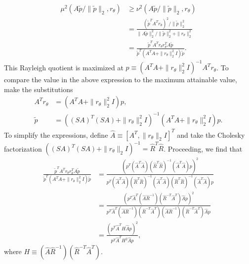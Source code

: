 \documentclass{article}
\newcommand{\ts}{^T}
\begin{document}
\begin{align*}
    \mu^2(A\widetilde{p}/\|\widetilde{p}\|_2, r_\theta) &\geq \nu^2(A\widetilde{p}/\|\widetilde{p}\|_2, r_\theta) \\
    &= \frac{(\widetilde{p}\ts A\ts r_\theta)^2/\|\widetilde{p}\|_2^2}{\|A\widetilde{p}\|_2^2/\|\widetilde{p}\|_2^2 + \|r_\theta\|_2^2} \\
    &= \frac{\widetilde{p}\ts A\ts r_\theta r_\theta\ts A\widetilde{p}}{\widetilde{p}\ts (A\ts A + \|r_\theta\|_2^2I)\widetilde{p}}.
\end{align*}
This Rayleigh quotient is maximized at $p\equiv (A\ts A + \|r_\theta\|_2^2I)^{-1}A\ts r_\theta$. To compare the value in the above expression to the maximum attainable value, make the substitutions
\begin{align*}
    A\ts r_\theta &= (A\ts A + \|r_\theta\|_2^2I)p, \\
    \widetilde{p} &= ((SA)\ts (SA) + \|r_\theta\|_2^2I)^{-1}(A\ts A + \|r_\theta\|_2^2I)p.
\end{align*}
To simplify the expressions, define $\hat{A}\equiv [A\ts, \|r_\theta\|_2I]\ts$ and take the Cholesky factorization $((SA)\ts (SA) + \|r_\theta\|_2I)^{-1} = \hat{R}\ts \hat{R}$. Proceeding, we find that
\begin{align*}
    \frac{\widetilde{p}\ts A\ts r_\theta r_\theta\ts A\widetilde{p}}{\widetilde{p}\ts (A\ts A + \|r_\theta\|_2^2I)\widetilde{p}}
    &= \frac{\left(p\ts(\hat{A}\ts\hat{A})(\hat{R}\ts \hat{R})^{-1}(\hat{A}\ts \hat{A})p\right)^2}{p\ts(\hat{A}\ts\hat{A})(\hat{R}\ts \hat{R})^{-1} (\hat{A}\ts \hat{A})(\hat{R}\ts\hat{R})^{-1}(\hat{A}\ts \hat{A})p} \\
    &= \frac{\left(p\ts\hat{A}\ts(\hat{A}\hat{R}^{-1}) (\hat{R}^{-T}\hat{A}\ts) \hat{A}p\right)^2}{p\ts\hat{A}\ts(\hat{A}\hat{R}^{-1}) (\hat{R}^{-T}\hat{A}\ts)(\hat{A}\hat{R}^{-1}) (\hat{R}^{-T}\hat{A}\ts) \hat{A}p} \\
    &= \frac{\left(p\ts\hat{A}\ts H \hat{A}p\right)^2}{p\ts\hat{A}\ts H^2 \hat{A}p},
\end{align*}
where $H \equiv (\hat{A}\hat{R}^{-1}) (\hat{R}^{-T}\hat{A}\ts)$. 
\end{document}
